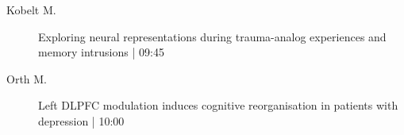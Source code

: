 \begin{symposium}
\begin{description}
                \item [ Kobelt M.] Exploring neural representations during trauma-analog experiences and memory intrusions \textcolor{mygray}{ | 09:45}    
                
                \item [ Orth M.] Left DLPFC modulation induces cognitive reorganisation in patients with depression \textcolor{mygray}{ | 10:00}    
                
            \end{description} 
            \end{symposium}
            